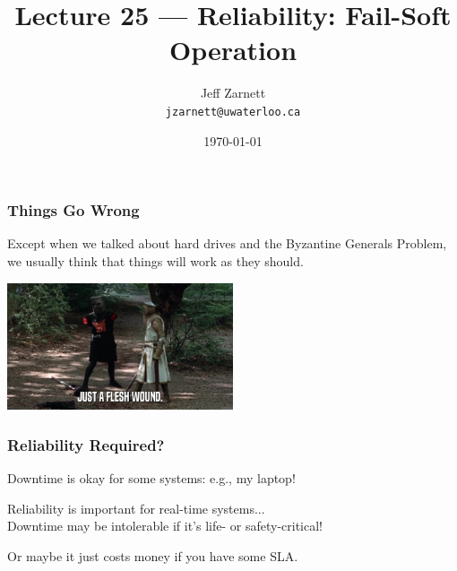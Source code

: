 

\title{Lecture 25 --- Reliability: Fail-Soft Operation }

\author{Jeff Zarnett \\ \small \texttt{jzarnett@uwaterloo.ca}}
\date{\today}




\begin{frame}
  \titlepage

 \end{frame}



\begin{frame}
\frametitle{Things Go Wrong}

Except when we talked about hard drives and the Byzantine Generals Problem, we usually think that things will work as they should.

\begin{center}
	\includegraphics[width=0.5\textwidth]{images/fleshwound.jpg}
\end{center}

\end{frame}

\begin{frame}
\frametitle{Reliability Required?}

Downtime is okay for some systems: e.g., my laptop!

Reliability is important for real-time systems...\\
\quad Downtime may be intolerable if it's life- or safety-critical!


Or maybe it just costs money if you have some SLA.

\end{frame}

